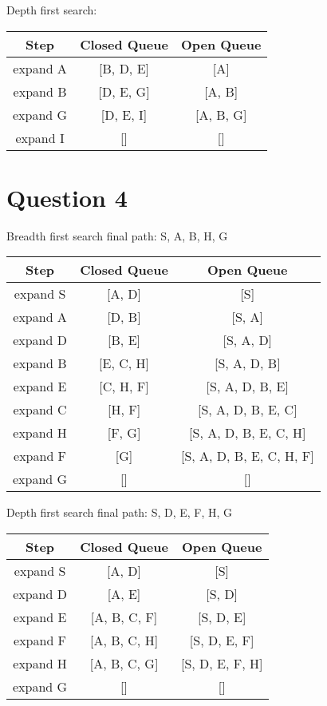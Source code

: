 \documentclass[12pt]{article}
\begin{document}
Depth first search:
\begin{center}
  \begin{tabular}{|c|c|c|}
    \hline
    \textbf{Step} & \textbf{Closed Queue} & \textbf{Open Queue} \\ \hline
    expand A & [B, D, E] & [A] \\ \hline
    expand B & [D, E, G] & [A, B] \\ \hline
    expand G & [D, E, I] & [A, B, G] \\ \hline
    expand I & [] & [] \\ \hline
  \end{tabular}
\end{center}

\section*{Question 4} %
\label{sec:question_4}
Breadth first search final path: S, A, B, H, G
\begin{center}
  \begin{tabular}{|c|c|c|}
    \hline
    \textbf{Step} & \textbf{Closed Queue} & \textbf{Open Queue} \\ \hline
    expand S & [A, D] & [S] \\ \hline
    expand A & [D, B] & [S, A] \\ \hline
    expand D & [B, E] & [S, A, D] \\ \hline
    expand B & [E, C, H] & [S, A, D, B] \\ \hline
    expand E & [C, H, F] & [S, A, D, B, E] \\ \hline
    expand C & [H, F] & [S, A, D, B, E, C] \\ \hline
    expand H & [F, G] & [S, A, D, B, E, C, H] \\ \hline
    expand F & [G] & [S, A, D, B, E, C, H, F] \\ \hline
    expand G & [] & [] \\ \hline
  \end{tabular}
\end{center}

Depth first search final path: S, D, E, F, H, G
\begin{center}
  \begin{tabular}{|c|c|c|}
    \hline
    \textbf{Step} & \textbf{Closed Queue} & \textbf{Open Queue} \\ \hline
    expand S & [A, D] & [S] \\ \hline
    expand D & [A, E] & [S, D] \\ \hline
    expand E & [A, B, C, F] & [S, D, E] \\ \hline
    expand F & [A, B, C, H] & [S, D, E, F]\\ \hline
    expand H & [A, B, C, G] & [S, D, E, F, H]\\ \hline
    expand G & [] & [] \\ \hline
  \end{tabular}
\end{center}
\end{document}
